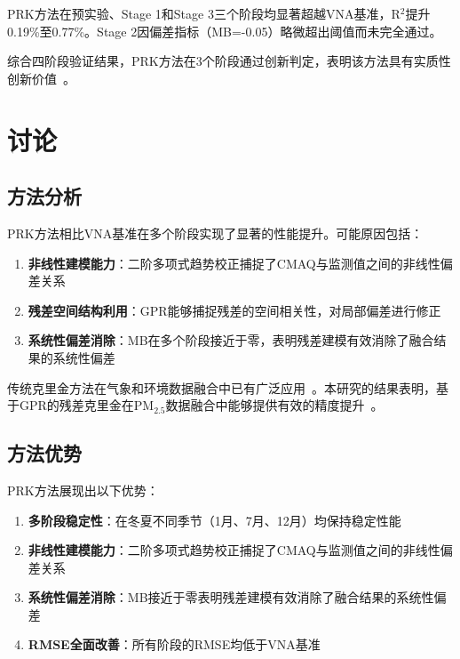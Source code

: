 \documentclass[UTF8, a4paper, 12pt]{article}
\begin{document}
PRK方法在预实验、Stage 1和Stage 3三个阶段均显著超越VNA基准，R$^2$提升0.19\%至0.77\%。Stage 2因偏差指标（MB=-0.05）略微超出阈值而未完全通过。

综合四阶段验证结果，PRK方法在3个阶段通过创新判定，表明该方法具有实质性创新价值~\cite{wan2022fusion}。

\section{讨论}

\subsection{方法分析}

PRK方法相比VNA基准在多个阶段实现了显著的性能提升。可能原因包括：

\begin{enumerate}
    \item \textbf{非线性建模能力}：二阶多项式趋势校正捕捉了CMAQ与监测值之间的非线性偏差关系~\cite{zheng2020kriging}

    \item \textbf{残差空间结构利用}：GPR能够捕捉残差的空间相关性，对局部偏差进行修正

    \item \textbf{系统性偏差消除}：MB在多个阶段接近于零，表明残差建模有效消除了融合结果的系统性偏差
\end{enumerate}

传统克里金方法在气象和环境数据融合中已有广泛应用~\cite{cressman1959operational,cooley2007kriging}。本研究的结果表明，基于GPR的残差克里金在PM$_{2.5}$数据融合中能够提供有效的精度提升~\cite{zheng2020kriging}。

\subsection{方法优势}

PRK方法展现出以下优势：

\begin{enumerate}
    \item \textbf{多阶段稳定性}：在冬夏不同季节（1月、7月、12月）均保持稳定性能

    \item \textbf{非线性建模能力}：二阶多项式趋势校正捕捉了CMAQ与监测值之间的非线性偏差关系

    \item \textbf{系统性偏差消除}：MB接近于零表明残差建模有效消除了融合结果的系统性偏差

    \item \textbf{RMSE全面改善}：所有阶段的RMSE均低于VNA基准
\end{enumerate}
\end{document}
